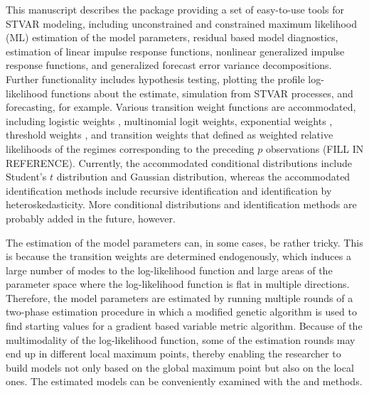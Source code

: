 \documentclass[nojss]{jss}
\begin{document}
This manuscript describes the  package  providing a set of easy-to-use tools for STVAR modeling, including unconstrained and constrained maximum likelihood (ML) estimation of the model parameters, residual based model diagnostics, estimation of linear impulse response functions, nonlinear generalized impulse response functions, and generalized forecast error variance decompositions. Further functionality includes hypothesis testing, plotting the profile log-likelihood functions about the estimate, simulation from STVAR processes, and forecasting, for example. Various transition weight functions are accommodated, including logistic weights \citep{Anderson+Vahid:1998}, multinomial logit weights, exponential weights \citep[e.g.,][]{Hubrich+Terasvirta:2013}, threshold weights \citep{Tsay:1998}, and transition weights that defined as weighted relative likelihoods of the regimes corresponding to the preceding $p$ observations (FILL IN REFERENCE). Currently, the accommodated conditional distributions include Student's $t$ distribution and Gaussian distribution, whereas the accommodated identification methods include recursive identification and identification by heteroskedasticity. More conditional distributions and identification methods are probably added in the future, however.

The estimation of the model parameters can, in some cases, be rather tricky. This is because the transition weights are determined endogenously, which induces a large number of modes to the log-likelihood function and large areas of the parameter space where the log-likelihood function is flat in multiple directions. Therefore, the model parameters are estimated by running multiple rounds of a two-phase estimation procedure in which a modified genetic algorithm is used to find starting values for a gradient based variable metric algorithm. Because of the multimodality of the log-likelihood function, some of the estimation rounds may end up in different local maximum points, thereby enabling the researcher to build models not only based on the global maximum point but also on the local ones. The estimated models can be conveniently examined with the  and  methods.
\end{document}
